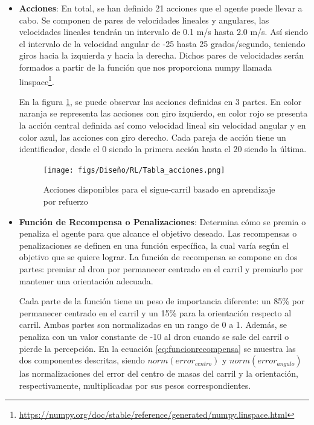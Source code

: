 \begin{itemize}
    \item \textbf{Acciones}: En total, se han definido 21 acciones que el agente puede llevar a cabo. Se componen de pares de velocidades lineales y angulares, las velocidades lineales
    tendrán un intervalo de 0.1 m/s hasta 2.0 m/s. Así siendo el intervalo de la velocidad angular de -25 hasta 25 grados/segundo, teniendo giros hacia la izquierda y hacia la derecha. Dichos pares
    de velocidades serán formados a partir de la función que nos proporciona numpy llamada linspace\footnote{\url{https://numpy.org/doc/stable/reference/generated/numpy.linspace.html}}. \newline

    En la figura \ref{fig:Acciones}, se puede observar las acciones definidas en 3 partes. En color naranja se representa las acciones con giro izquierdo, en color rojo se presenta 
    la acción central definida así como velocidad lineal sin velocidad angular y en color azul, las acciones con giro derecho. Cada pareja de acción tiene un identificador, desde el 0
    siendo la primera acción hasta el 20 siendo la última. \newline
  
    \begin{figure} [H]
      \begin{center}
        \texttt{[image: figs/Diseño/RL/Tabla\_acciones.png]}
      \end{center}
      \caption{Acciones disponibles para el sigue-carril basado en aprendizaje por refuerzo}
      \label{fig:Acciones}
    \end{figure}
  
    \item \textbf{Función de Recompensa o Penalizaciones}: Determina cómo se premia o penaliza el agente para que alcance el objetivo deseado. Las recompensas o penalizaciones
    se definen en una función específica, la cual varía según el objetivo que se quiere lograr. La función de recompensa se compone en dos partes: premiar al dron por permanecer 
    centrado en el carril y premiarlo por mantener una orientación adecuada. 

    Cada parte de la función tiene un peso de importancia diferente: un 85\% por permanecer centrado en el carril y un 15\% para la orientación respecto al carril. Ambas partes 
    son normalizadas en un rango de 0 a 1. Además, se penaliza con un valor constante de -10 al dron cuando se sale del carril o pierde la percepción. En la ecuación 
    \ref{eq:funcionrecompensa} se muestra las dos componentes descritas, siendo $norm(error_{centro})$ y $norm(error_{angulo})$ las normalizaciones del error del centro de 
    masas del carril y la orientación, respectivamente, multiplicadas por sus pesos correspondientes.


\end{itemize}
